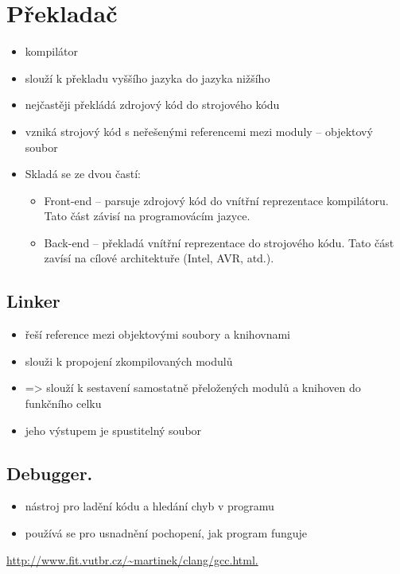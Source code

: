 \documentclass{szzclass}
\begin{document}
\section{Překladač}
\begin{itemize}
\item kompilátor
\item slouží k překladu vyššího jazyka do jazyka nižšího
\item nejčastěji překládá zdrojový kód do strojového kódu
\item vzniká strojový kód s neřešenými referencemi mezi moduly – objektový soubor
\item Skladá se ze dvou častí:
  \begin{itemize}
    \item Front-end  – parsuje zdrojový kód do vnítřní reprezentace kompilátoru. Tato část závisí na programovácím jazyce.
    \item Back-end – překladá vnítřní reprezentace do strojového kódu. Tato část zavísí na cílové architektuře (Intel, AVR, atd.).
  \end{itemize}
\end{itemize}
\subsection{Linker}
\begin{itemize}
\item řeší reference mezi objektovými soubory a knihovnami
\item slouži k propojení zkompilovaných modulů
\item => slouží k sestavení samostatně přeložených modulů a knihoven do funkčního celku
\item jeho výstupem je spustitelný soubor
\end{itemize}
\subsection{Debugger.}
\begin{itemize}
  \item nástroj pro ladění kódu a hledání chyb v programu
  \item používá se pro usnadnění pochopení, jak program funguje
\end{itemize}

\url{http://www.fit.vutbr.cz/~martinek/clang/gcc.html.}
\end{document}
